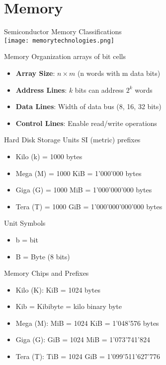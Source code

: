 \section{Memory}



\begin{definition}{Semiconductor Memory Classifications}\\
\texttt{[image: memorytechnologies.png]}
\end{definition}

\begin{concept}{Memory Organization} arrays of bit cells
\begin{itemize}
    \item \textbf{Array Size}: $n \times m$ (n words with m data bits)
    \item \textbf{Address Lines}: $k$ bits can address $2^k$ words
    \item \textbf{Data Lines}: Width of data bus (8, 16, 32 bits)
    \item \textbf{Control Lines}: Enable read/write operations
\end{itemize}
\end{concept}

\begin{corollary}{Hard Disk Storage Units} SI (metric) prefixes
    \begin{itemize}
        \item Kilo (k) = 1000 bytes
        \item Mega (M) = 1000 KiB = 1'000'000 bytes
        \item Giga (G) = 1000 MiB = 1'000'000'000 bytes
        \item Tera (T) = 1000 GiB = 1'000'000'000'000 bytes
    \end{itemize}
\end{corollary}

\begin{theorem}{Unit Symbols}
    \begin{itemize}
        \item b = bit
        \item B = Byte (8 bits)
    \end{itemize}
\end{theorem}

\begin{corollary}{Memory Chips and Prefixes}
    \begin{itemize}
        \item Kilo (K): KiB = 1024 bytes 
        \item Kib = Kibibyte = kilo binary byte
        \item Mega (M): MiB = 1024 KiB = 1'048'576 bytes
        \item Giga (G): GiB = 1024 MiB = 1'073'741'824 
        \item Tera (T): TiB = 1024 GiB = 1'099'511'627'776 
    \end{itemize}
\end{corollary}

